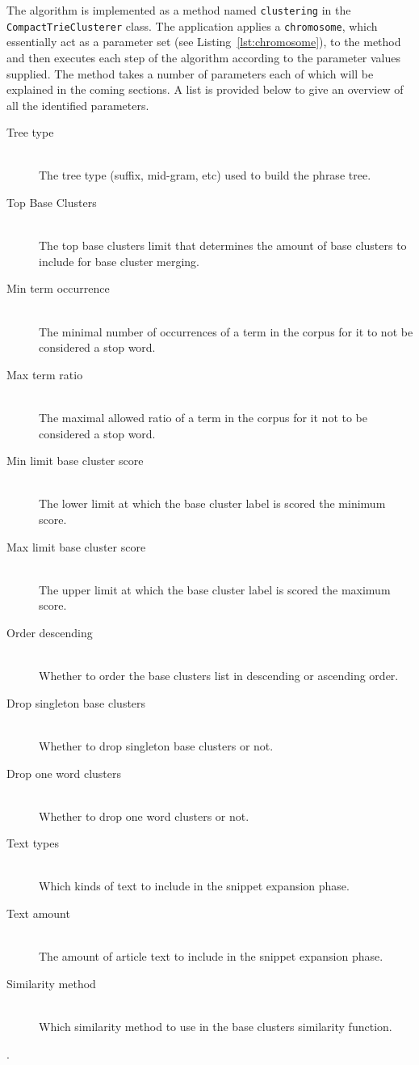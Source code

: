 The \CTC algorithm is implemented as a method named \texttt{clustering} in the \texttt{CompactTrieClusterer} class. The application applies a \texttt{chromosome}, which essentially act as a parameter set (see Listing~\ref{lst:chromosome}), to the method and then executes each step of the \CTC algorithm according to the parameter values supplied. The method takes a number of parameters each of which will be explained in the coming sections. A list is provided below to give an overview of all the identified parameters.
\begin{description}
\item[Tree type]\hfill \\The tree type (suffix, mid-gram, etc) used to build the phrase tree.
\item[Top Base Clusters]\hfill \\The top base clusters limit that determines the amount of base clusters to include for base cluster merging.
\item[Min term occurrence]\hfill \\The minimal number of occurrences of a term in the corpus for it to not be considered a stop word.
\item[Max term ratio]\hfill \\The maximal allowed ratio of a term in the corpus for it not to be considered a stop word.
\item[Min limit base cluster score]\hfill \\The lower limit at which the base cluster label is scored the minimum score.
\item[Max limit base cluster score]\hfill \\The upper limit at which the base cluster label is scored the maximum score.
\item[Order descending]\hfill \\Whether to order the base clusters list in descending or ascending order.
\item[Drop singleton base clusters]\hfill \\Whether to drop singleton base clusters or not.
\item[Drop one word clusters]\hfill \\Whether to drop one word clusters or not.
\item[Text types]\hfill \\Which kinds of text to include in the snippet expansion phase.
\item[Text amount]\hfill \\The amount of article text to include in the snippet expansion phase.
\item[Similarity method]\hfill \\Which similarity method to use in the base clusters similarity function.
\end{description}.

